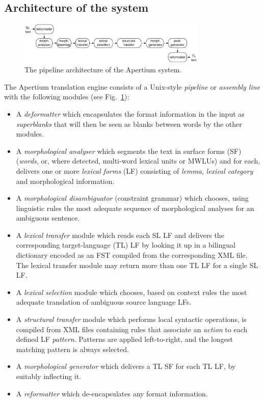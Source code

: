 \documentclass[10pt,a5paper,twoside]{article}
\begin{document}
\subsection{Architecture of the system}

\begin{figure}[htbp]
\begin{center}
 \includegraphics[width=0.8\textwidth]{architecture.pdf}
\end{center}
\caption{The pipeline architecture of the Apertium system.}
\label{fig:modules}
\end{figure}

The Apertium translation engine consists of a Unix-style \emph{pipeline} or
\emph{assembly line} with the following modules (see Fig.~\ref{fig:modules}):  
\begin{itemize}
\item A \emph{deformatter} which encapsulates the format information
 in the input as \emph{superblanks} that will then be seen
 as blanks between words by the other modules.
\item A \emph{morphological analyser} which segments the text in
  surface forms (SF) (\emph{words}, or, where detected, multi-word lexical
  units or MWLUs) and for each, delivers one or more \emph{lexical
    forms} (LF) consisting of \emph{lemma}, \emph{lexical category} and
  morphological information. 
\item A \emph{morphological disambiguator} (constraint grammar) which chooses, using linguistic rules
  the most adequate sequence of morphological analyses for an ambiguous sentence. 
\item A \emph{lexical transfer} module which reads each SL LF 
  and delivers the corresponding target-language (TL) LF
  by looking it up in a bilingual dictionary encoded as an FST
  compiled from the corresponding XML file. The lexical transfer module may
  return more than one TL LF for a single SL LF.
\item A \emph{lexical selection} module which chooses, based on context 
  rules the most adequate translation of ambiguous source language LFs.
\item A \emph{structural transfer} module which
    performs local syntactic operations, is compiled from XML files containing rules that 
    associate an \emph{action} to each defined LF \emph{pattern}. Patterns are applied left-to-right, and the 
    longest matching pattern is always selected.
\item A \emph{morphological generator} which delivers a TL SF
 for each TL LF, by suitably inflecting it. 
\item A \emph{reformatter} which de-encapsulates any format
  information.
\end{itemize}
\end{document}
